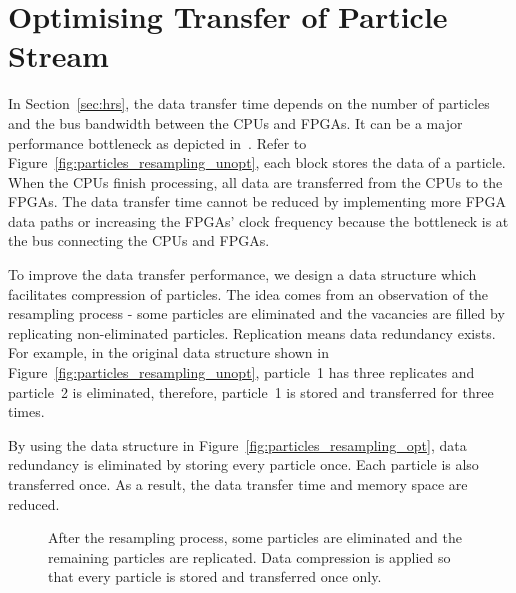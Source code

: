 \section{Optimising Transfer of Particle Stream}
\label{sec:stream}

In Section~\ref{sec:hrs}, the data transfer time depends on the number of particles and the bus bandwidth between the CPUs and FPGAs.
It can be a major performance bottleneck as depicted in~\cite{chau13a}.
Refer to Figure~\ref{fig:particles_resampling_unopt}, each block stores the data of a particle.
When the CPUs finish processing, all data are transferred from the CPUs to the FPGAs.
The data transfer time cannot be reduced by implementing more FPGA data paths or increasing the FPGAs' clock frequency because the bottleneck is at the bus connecting the CPUs and FPGAs.

To improve the data transfer performance, we design a data structure which facilitates compression of particles.
The idea comes from an observation of the resampling process - some particles are eliminated and the vacancies are filled by replicating non-eliminated particles.
Replication means data redundancy exists.
For example, in the original data structure shown in Figure~\ref{fig:particles_resampling_unopt}, 
particle~1 has three replicates and particle~2 is eliminated, therefore, particle~1 is stored and transferred for three times.

By using the data structure in Figure~\ref{fig:particles_resampling_opt}, data redundancy is eliminated by storing every particle once.
Each particle is also transferred once.
As a result, the data transfer time and memory space are reduced.

\setcounter{subfigure}{0}
\begin{figure}[t!]
\centering
{}
\caption{After the resampling process, some particles are eliminated and the remaining particles are replicated. Data compression is applied so that every particle is stored and transferred once only.}
\label{fig:particles_resampling}
\end{figure}

